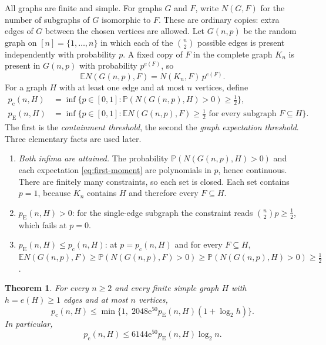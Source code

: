 \documentclass[11pt]{article}
\newtheorem{theorem}{Theorem}[section]
\numberwithin{equation}{section}
\theoremstyle{remark}
\newcommand{\PP}{\mathbb P}
\newcommand{\EE}{\mathbb E}
\newcommand{\pc}{p_{\mathrm c}}
\newcommand{\pE}{p_{\mathrm E}}
\newcommand{\ee}{\mathrm e}
\begin{document}
All graphs are finite and simple. For graphs $G$ and $F$, write $N(G,F)$
for the number of subgraphs of $G$ isomorphic to $F$. These are ordinary
copies: extra edges of $G$ between the chosen vertices are allowed. Let
$G(n,p)$ be the random graph on $[n]=\{1,\ldots,n\}$ in which each of
the $\binom n2$ possible edges is present independently with probability
$p$. A fixed copy of $F$ in the complete graph $K_n$ is present in
$G(n,p)$ with probability $p^{e(F)}$, so
\begin{equation}\label{eq:first-moment}
 \EE N(G(n,p),F)=N(K_n,F)\,p^{e(F)} .
\end{equation}
For a graph $H$ with at least one edge and at most $n$ vertices, define
\begin{align*}
 \pc(n,H)
 &=\inf\{p\in[0,1]:\PP(N(G(n,p),H)>0)\ge\tfrac12\},\\
 \pE(n,H)
 &=\inf\{p\in[0,1]:\EE N(G(n,p),F)\ge\tfrac12
                 \text{ for every subgraph }F\subseteq H\}.
\end{align*}
The first is the \emph{containment threshold}, the second the
\emph{graph expectation threshold}. Three elementary facts are used
later.
\begin{enumerate}[label=(\alph*),leftmargin=2em,itemsep=2pt]
 \item \emph{Both infima are attained.} The probability
 $\PP(N(G(n,p),H)>0)$ and each expectation \eqref{eq:first-moment} are
 polynomials in $p$, hence continuous. There are finitely many
 constraints, so each set is closed. Each set contains $p=1$, because
 $K_n$ contains $H$ and therefore every $F\subseteq H$.
 \item $\pE(n,H)>0$: for the single-edge subgraph the constraint reads
 $\binom n2p\ge\frac12$, which fails at $p=0$.
 \item $\pE(n,H)\le\pc(n,H)$: at $p=\pc(n,H)$ and for every
 $F\subseteq H$,
 $\EE N(G(n,p),F)\ge\PP(N(G(n,p),F)>0)\ge\PP(N(G(n,p),H)>0)\ge\frac12$.
\end{enumerate}

\begin{theorem}\label{thm:main}
For every $n\ge2$ and every finite simple graph $H$ with $h=e(H)\ge1$
edges and at most $n$ vertices,
\begin{equation}\label{eq:stronger}
 \pc(n,H)\le
 \min\{1,\;2048\ee^{50}\pE(n,H)(1+\log_2 h)\}.
\end{equation}
In particular,
\[
 \pc(n,H)\le6144\ee^{50}\pE(n,H)\log_2 n.
\]
\end{theorem}
\end{document}
